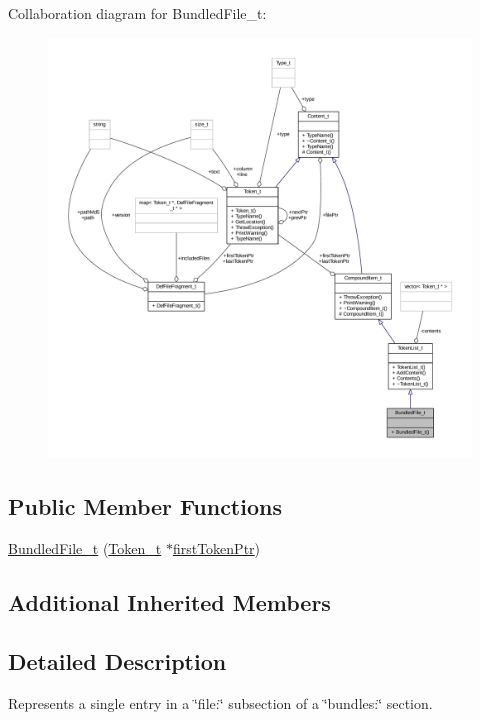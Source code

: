Collaboration diagram for Bundled\+File\+\_\+t\+:
\nopagebreak
\begin{figure}[H]
\begin{center}
\leavevmode
\includegraphics[width=350pt]{struct_bundled_file__t__coll__graph}
\end{center}
\end{figure}
\subsection*{Public Member Functions}
\begin{DoxyCompactItemize}
\item 
\hyperlink{struct_bundled_file__t_a983b53274aeeb8cea6037ef3d9460f3f}{Bundled\+File\+\_\+t} (\hyperlink{struct_token__t}{Token\+\_\+t} $\ast$\hyperlink{struct_compound_item__t_a4d95dc788120f627e332491589d20c5c}{first\+Token\+Ptr})
\end{DoxyCompactItemize}
\subsection*{Additional Inherited Members}


\subsection{Detailed Description}
Represents a single entry in a \char`\"{}file\+:\char`\"{} subsection of a \char`\"{}bundles\+:\char`\"{} section. 


